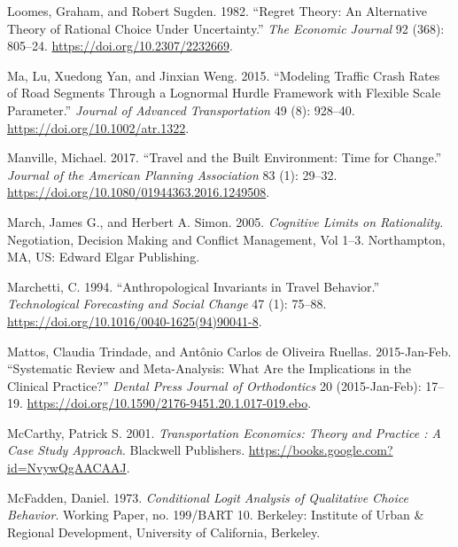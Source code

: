 \documentclass[
  11pt,
  openany]{memoir}
\newlength{\cslhangindent}
\newlength{\cslentryspacingunit} %
\newenvironment{CSLReferences}[2] %
 {%
  \setlength{\parindent}{0pt}
  \ifodd #1
  \let\oldpar\par
  \def\par{\hangindent=\cslhangindent\oldpar}
  \fi
  \setlength{\parskip}{#2\cslentryspacingunit}
 }%
 {}
\begin{document}
\begin{CSLReferences}{1}{0}
\leavevmode{}%
Loomes, Graham, and Robert Sugden. 1982. {``Regret {Theory}: An {Alternative Theory} of {Rational Choice Under Uncertainty}.''} \emph{The Economic Journal} 92 (368): 805--24. \url{https://doi.org/10.2307/2232669}.

\leavevmode{}%
Ma, Lu, Xuedong Yan, and Jinxian Weng. 2015. {``Modeling Traffic Crash Rates of Road Segments Through a Lognormal Hurdle Framework with Flexible Scale Parameter.''} \emph{Journal of Advanced Transportation} 49 (8): 928--40. \url{https://doi.org/10.1002/atr.1322}.

\leavevmode{}%
Manville, Michael. 2017. {``Travel and the {Built Environment}: Time for {Change}.''} \emph{Journal of the American Planning Association} 83 (1): 29--32. \url{https://doi.org/10.1080/01944363.2016.1249508}.

\leavevmode{}%
March, James G., and Herbert A. Simon. 2005. \emph{Cognitive {Limits} on {Rationality}}. Negotiation, Decision Making and Conflict Management, {Vol} 1--3. {Northampton, MA, US}: {Edward Elgar Publishing}.

\leavevmode{}%
Marchetti, C. 1994. {``Anthropological Invariants in Travel Behavior.''} \emph{Technological Forecasting and Social Change} 47 (1): 75--88. \url{https://doi.org/10.1016/0040-1625(94)90041-8}.

\leavevmode{}%
Mattos, Claudia Trindade, and Antônio Carlos de Oliveira Ruellas. 2015-Jan-Feb. {``Systematic Review and Meta-Analysis: What Are the Implications in the Clinical Practice?''} \emph{Dental Press Journal of Orthodontics} 20 (2015-Jan-Feb): 17--19. \url{https://doi.org/10.1590/2176-9451.20.1.017-019.ebo}.

\leavevmode{}%
McCarthy, Patrick S. 2001. \emph{Transportation {Economics}: Theory and {Practice} : A {Case Study Approach}}. {Blackwell Publishers}. \url{https://books.google.com?id=NvywQgAACAAJ}.

\leavevmode{}%
McFadden, Daniel. 1973. \emph{Conditional Logit Analysis of Qualitative Choice Behavior}. Working Paper, no. 199/BART 10. {Berkeley}: {Institute of Urban \& Regional Development, University of California, Berkeley}.


\end{CSLReferences}
\end{document}
